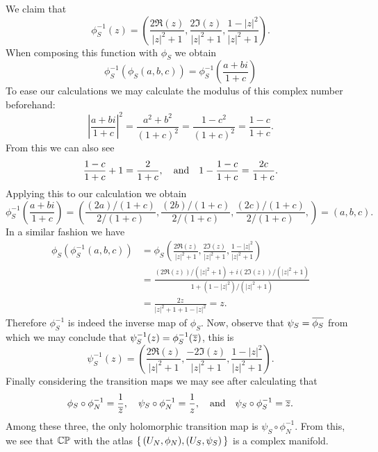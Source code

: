\documentclass[12pt]{memoir}
\begin{document}
\begin{ptcbr}
We claim that 
$$\phi_S^{-1}(z)=\left(\frac
{2\Re(z)}{|z|^2+1},\frac
{2\Im(z)}{|z|^2+1},\frac
{1-|z|^2}{|z|^2+1}\right).$$
When composing this function with $\phi_S$ we obtain 
$$\phi_S^{-1}(\phi_S(a,b,c))=\phi_S^{-1}\left(\frac{a+bi}{1+c}\right)$$
To ease our calculations we may calculate the modulus of this complex number beforehand:
$$\left|\frac{a+bi}{1+c}\right|^2=\frac{a^2+b^2}{(1+c)^2}=\frac{1-c^2}{(1+c)^2}=\frac{1-c}{1+c}.$$
From this we can also see
$$\frac{1-c}{1+c}+1=\frac{2}{1+c},\quad\text{and}\quad1-\frac{1-c}{1+c}=\frac{2c}{1+c}.$$
Applying this to our calculation we obtain 
$$\phi_S^{-1}\left(\frac{a+bi}{1+c}\right)=\left(\frac{(2a)/(1+c)}{2/(1+c)},\frac{(2b)/(1+c)}{2/(1+c)},\frac{(2c)/(1+c)}{2/(1+c)},\right)=(a,b,c).$$
In a similar fashion we have 
\begin{align*}
    \phi_S(\phi_S^{-1}(a,b,c))&=\phi_S\left(\frac
{2\Re(z)}{|z|^2+1},\frac
{2\Im(z)}{|z|^2+1},\frac
{1-|z|^2}{|z|^2+1}\right)\\
&=\frac{(2\Re(z))/(|z|^2+1)+i(2\Im(z))/(|z|^2+1)}{1+(1-|z|^2)/(|z|^2+1)}\\
&=\frac{2z}{|z|^2+1+1-|z|^2}=z.
\end{align*}
Therefore $\phi_S^{-1}$ is indeed the inverse map of $\phi_S$. Now, observe that $\psi_S=\overline{\phi_S}$ from which we may conclude that $\psi_S^{-1}(z)=\phi_S^{-1}(\overline z)$, this is 
$$\psi_S^{-1}(z)=\left(\frac
{2\Re(z)}{|z|^2+1},\frac
{-2\Im(z)}{|z|^2+1},\frac
{1-|z|^2}{|z|^2+1}\right).$$
Finally considering the transition maps we may see after calculating that 
$$\phi_S\circ \phi_N^{-1}=\frac{1}{\overline z},\quad \psi_S\circ \phi_N^{-1}=\frac{1}{ z},\quad\text{and}\quad\psi_S\circ\phi_S^{-1}=\overline z.$$
Among these three, the only holomorphic transition map is $\psi_S\circ \phi_N^{-1}$. From this, we see that $\mathbb{CP}$ with the atlas $\{\,(U_N,\phi_N),(U_S,\psi_S)\,\}$ is a complex manifold.
\end{ptcbr}
\end{document}
